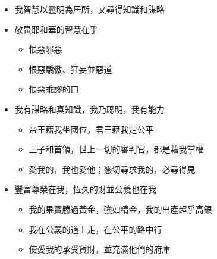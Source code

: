 \begin{itemize}
\itemsep-.45em  
\item 我智慧以靈明為居所，又尋得知識和謀略
\item 敬畏耶和華的智慧在乎
\begin{itemize}
\itemsep-.45em  
\item 恨惡邪惡
\item 恨惡驕傲、狂妄並惡道
\item 恨惡乖謬的口
\end{itemize}
\item 我有謀略和真知識，我乃聰明，我有能力
\begin{itemize}
\itemsep-.45em  
\item 帝王藉我坐國位，君王藉我定公平
\item 王子和首領，世上一切的審判官，都是藉我掌權
\item 愛我的，我也愛他；懇切尋求我的，必尋得見
\end{itemize}
\item 豐富尊榮在我，恆久的財並公義也在我
\begin{itemize}
\itemsep-.45em  
\item 我的果實勝過黃金，強如精金，我的出產超乎高銀
\item 我在公義的道上走，在公平的路中行
\item 使愛我的承受貨財，並充滿他們的府庫
\end{itemize}
\end{itemize}

